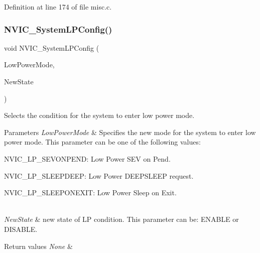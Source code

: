 Definition at line 174 of file misc.\+c.

\mbox{\label{group___m_i_s_c___private___functions_gae21011c5232f5b8f366acbecd12a1d4a}} 
\subsubsection{\texorpdfstring{N\+V\+I\+C\+\_\+\+System\+L\+P\+Config()}{NVIC\_SystemLPConfig()}}
{\footnotesize\ttfamily void N\+V\+I\+C\+\_\+\+System\+L\+P\+Config (\begin{DoxyParamCaption}\item[{uint8\+\_\+t}]{Low\+Power\+Mode,  }\item[{Functional\+State}]{New\+State }\end{DoxyParamCaption})}



Selects the condition for the system to enter low power mode. 


\begin{DoxyParams}{Parameters}
{\em Low\+Power\+Mode} & Specifies the new mode for the system to enter low power mode. This parameter can be one of the following values\+: \begin{DoxyItemize}
\item N\+V\+I\+C\+\_\+\+L\+P\+\_\+\+S\+E\+V\+O\+N\+P\+E\+ND\+: Low Power S\+EV on Pend. \item N\+V\+I\+C\+\_\+\+L\+P\+\_\+\+S\+L\+E\+E\+P\+D\+E\+EP\+: Low Power D\+E\+E\+P\+S\+L\+E\+EP request. \item N\+V\+I\+C\+\_\+\+L\+P\+\_\+\+S\+L\+E\+E\+P\+O\+N\+E\+X\+IT\+: Low Power Sleep on Exit. \end{DoxyItemize}
\\
\hline
{\em New\+State} & new state of LP condition. This parameter can be\+: E\+N\+A\+B\+LE or D\+I\+S\+A\+B\+LE. \\
\hline
\end{DoxyParams}

\begin{DoxyRetVals}{Return values}
{\em None} & \\
\hline
\end{DoxyRetVals}


